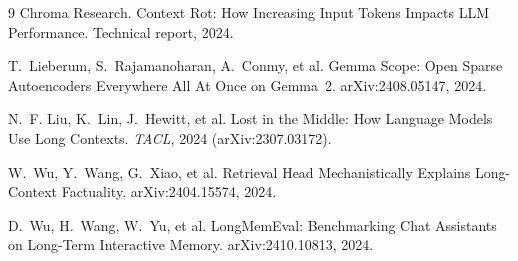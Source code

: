 \documentclass[10pt,twocolumn]{article}
\begin{document}
\begin{thebibliography}{9}
Chroma Research.
\newblock Context Rot: How Increasing Input Tokens Impacts LLM Performance.
\newblock Technical report, 2024.

T.~Lieberum, S.~Rajamanoharan, A.~Conmy, et al.
\newblock Gemma Scope: Open Sparse Autoencoders Everywhere All At Once on Gemma~2.
\newblock arXiv:2408.05147, 2024.

N.~F. Liu, K.~Lin, J.~Hewitt, et al.
\newblock Lost in the Middle: How Language Models Use Long Contexts.
\newblock \emph{TACL}, 2024 (arXiv:2307.03172).

W.~Wu, Y.~Wang, G.~Xiao, et al.
\newblock Retrieval Head Mechanistically Explains Long-Context Factuality.
\newblock arXiv:2404.15574, 2024.

D.~Wu, H.~Wang, W.~Yu, et al.
\newblock LongMemEval: Benchmarking Chat Assistants on Long-Term Interactive Memory.
\newblock arXiv:2410.10813, 2024.
\end{thebibliography}
\end{document}
